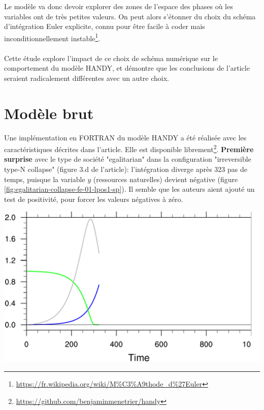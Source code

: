 \documentclass[12pt]{scrartcl}
\begin{document}
Le modèle va donc devoir explorer des zones de l'espace des phases où les variables ont de très petites valeurs. On peut alors s'étonner du choix du schéma d'intégration Euler explicite, connu pour être facile à coder mais inconditionnellement instable\footnote{\url{https://fr.wikipedia.org/wiki/M\%C3\%A9thode_d\%27Euler}}.\\
$  $\\
Cette étude explore l'impact de ce choix de schéma numérique sur le comportement du modèle HANDY, et démontre que les conclusions de l'article seraient radicalement différentes avec un autre choix.

\section{Modèle brut}
Une implémentation en FORTRAN du modèle HANDY a été réalisée avec les caractéristiques décrites dans l'article. Elle est disponible librement\footnote{\url{https://github.com/benjaminmenetrier/handy}}. \textbf{Première surprise} avec le type de société "egalitarian" dans la configuration "irreversible type-N collapse" (figure 3.d de l'article): l'intégration diverge après 323 pas de temps, puisque la variable $y$ (ressources naturelles) devient négative (figure \ref{fig:egalitarian-collapse-fe-01-lpos1-sp}). Il semble que les auteurs aient ajouté un test de positivité, pour forcer les valeurs négatives à zéro.

\begin{center}
\includegraphics[width=0.7\linewidth]{../ncl/egalitarian-collapse-fe-01-lpos1-sp.pdf}
\end{center}
\end{document}
